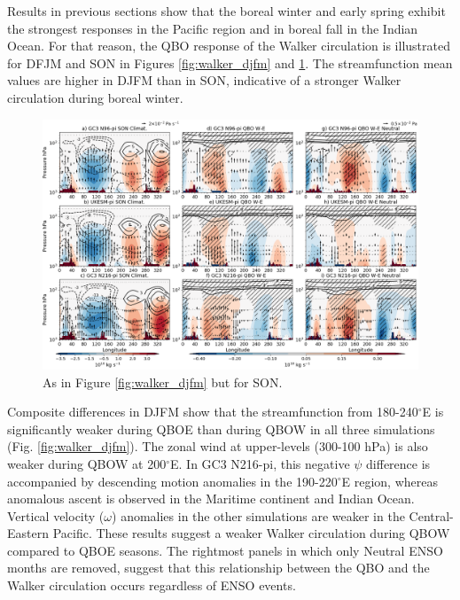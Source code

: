 Results in previous sections show that the boreal winter and early spring exhibit the strongest responses in the Pacific region and in boreal fall in the Indian Ocean. For that reason, the QBO response of the Walker circulation is illustrated for DFJM and SON in Figures \ref{fig:walker_djfm} and \ref{fig:walker_son}.
The streamfunction mean values are higher in DJFM than in SON, indicative of a stronger Walker circulation during boreal winter.

\begin{figure}[b!]
\centering
 \noindent
 \includegraphics[width=\linewidth]{figures/cmip_streamson.png}
\caption[Walker circulation anomalies in SON]{As in Figure \ref{fig:walker_djfm} but for SON. }
\label{fig:walker_son}
\end{figure}

Composite differences in DJFM show that the streamfunction from 180-240$^\circ$E is significantly weaker during QBOE than during QBOW in all three simulations (Fig. \ref{fig:walker_djfm}). The zonal wind at upper-levels (300-100 hPa) is also weaker during QBOW at 200$^\circ$E. In GC3 N216-pi, this negative $\psi$ difference is accompanied by descending motion anomalies in the 190-220$^\circ$E region, whereas anomalous ascent is observed in the Maritime continent and Indian Ocean. Vertical velocity ($\omega$) anomalies in the other simulations are weaker in the Central-Eastern Pacific. 
These results suggest a weaker Walker circulation during QBOW compared to QBOE seasons. 
The rightmost panels in which only Neutral ENSO months are removed, suggest that this relationship between the QBO and the Walker circulation occurs regardless of ENSO events.

